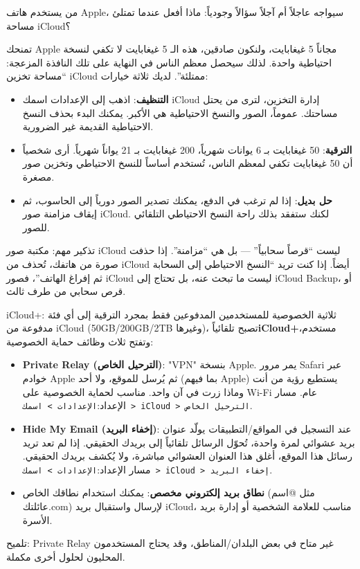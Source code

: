 
من يستخدم هاتف Apple، سيواجه عاجلاً أم آجلاً سؤالاً وجودياً: ماذا أفعل عندما تمتلئ مساحة iCloud؟

تمنحك Apple مجاناً 5 غيغابايت، ولنكون صادقين، هذه الـ 5 غيغابايت لا تكفي لنسخة احتياطية واحدة. لذلك سيحصل معظم الناس في النهاية على تلك النافذة المزعجة: “مساحة تخزين iCloud ممتلئة”. لديك ثلاثة خيارات:

\begin{itemize}
  \item \textbf{التنظيف}: اذهب إلى الإعدادات اسمك iCloud إدارة التخزين، لترى من يحتل مساحتك. عموماً، الصور والنسخ الاحتياطية هي الأكبر. يمكنك البدء بحذف النسخ الاحتياطية القديمة غير الضرورية.
  \item \textbf{الترقية}: 50 غيغابايت بـ 6 يوانات شهرياً، 200 غيغابايت بـ 21 يواناً شهرياً. أرى شخصياً أن 50 غيغابايت تكفي لمعظم الناس، تُستخدم أساساً للنسخ الاحتياطي وتخزين صور مصغرة.
  \item \textbf{حل بديل}: إذا لم ترغب في الدفع، يمكنك تصدير الصور دورياً إلى الحاسوب، ثم إيقاف مزامنة صور iCloud. لكنك ستفقد بذلك راحة النسخ الاحتياطي التلقائي للصور.
\end{itemize}

تذكير مهم: مكتبة صور iCloud ليست “قرصاً سحابياً” — بل هي “مزامنة”. إذا حذفت صورة من هاتفك، تُحذف من iCloud أيضاً. إذا كنت تريد “النسخ الاحتياطي إلى السحابة ثم إفراغ الهاتف”، فصور iCloud ليست ما تبحث عنه، بل تحتاج إلى iCloud Backup، أو قرص سحابي من طرف ثالث.

\begin{tcbinfo}{iCloud+: ثلاثية الخصوصية للمستخدمين المدفوعين فقط}
بمجرد الترقية إلى أي فئة مدفوعة من iCloud (50GB/200GB/2TB وغيرها)، تصبح تلقائياً\textbf{iCloud+}مستخدم، وتفتح ثلاث وظائف حماية الخصوصية:

\begin{itemize}
  \item \textbf{Private Relay (الترحيل الخاص)}: "VPN" بنسخة Apple. يمر مرور Safari عبر خوادم Apple ثم يُرسل للموقع، ولا أحد (بما فيهم Apple) يستطيع رؤية من أنت وماذا زرت في آن واحد. مناسب لحماية الخصوصية على Wi-Fi عام. مسار الإعداد:\texttt{الإعدادات > اسمك > iCloud > الترحيل الخاص}.
  \item \textbf{Hide My Email (إخفاء البريد)}: عند التسجيل في المواقع/التطبيقات يولّد عنوان بريد عشوائي لمرة واحدة، تُحوّل الرسائل تلقائياً إلى بريدك الحقيقي. إذا لم تعد تريد رسائل هذا الموقع، أغلق هذا العنوان العشوائي مباشرة، ولا يُكشف بريدك الحقيقي. مسار الإعداد:\texttt{الإعدادات > اسمك > iCloud > إخفاء البريد}.
  \item \textbf{نطاق بريد إلكتروني مخصص}: يمكنك استخدام نطاقك الخاص (مثل @اسم عائلتك.com) لإرسال واستقبال بريد iCloud، مناسب للعلامة الشخصية أو إدارة بريد الأسرة.
\end{itemize}

تلميح: Private Relay غير متاح في بعض البلدان/المناطق، وقد يحتاج المستخدمون المحليون لحلول أخرى مكملة.

\end{tcbinfo}

